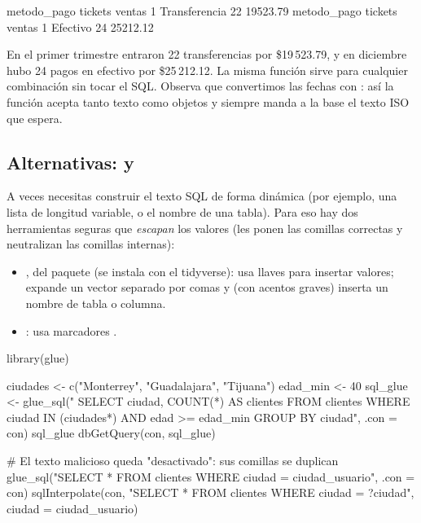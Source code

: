 \begin{rsalida}
    metodo_pago tickets   ventas
1 Transferencia      22 19523.79
  metodo_pago tickets   ventas
1    Efectivo      24 25212.12
\end{rsalida}

En el primer trimestre entraron 22 transferencias por \$19\,523.79, y en
diciembre hubo 24 pagos en efectivo por \$25\,212.12. La misma función sirve
para cualquier combinación sin tocar el SQL. Observa que convertimos las fechas con
: así la función acepta tanto texto como
objetos  y siempre manda a la base el texto ISO que espera.

\subsection{Alternativas: \texorpdfstring{}{glue\_sql()} y \texorpdfstring{}{sqlInterpolate()}}

A veces necesitas construir el texto SQL de forma dinámica (por ejemplo, una
lista  de longitud variable, o el nombre de una tabla).
Para eso hay dos herramientas seguras que \emph{escapan} los valores (les
ponen las comillas correctas y neutralizan las comillas internas):

\begin{itemize}
  \item {}, del paquete  (se instala
        con el tidyverse): usa llaves \codigo{\{\}} para insertar valores;
         expande un vector separado por comas y
         (con acentos graves) inserta un nombre de
        tabla o columna.
  \item {}: usa marcadores .
\end{itemize}

\begin{rcode}
library(glue)

ciudades <- c("Monterrey", "Guadalajara", "Tijuana")
edad_min <- 40
sql_glue <- glue_sql("
  SELECT ciudad, COUNT(*) AS clientes
  FROM clientes
  WHERE ciudad IN ({ciudades*}) AND edad >= {edad_min}
  GROUP BY ciudad", .con = con)
sql_glue
dbGetQuery(con, sql_glue)

# El texto malicioso queda "desactivado": sus comillas se duplican
glue_sql("SELECT * FROM clientes WHERE ciudad = {ciudad_usuario}",
         .con = con)
sqlInterpolate(con, "SELECT * FROM clientes WHERE ciudad = ?ciudad",
               ciudad = ciudad_usuario)
\end{rcode}

